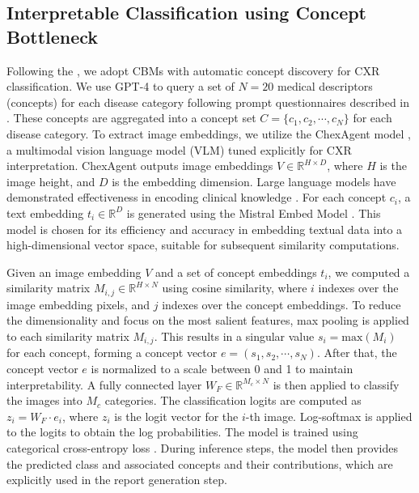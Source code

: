 \documentclass[runningheads]{llncs}
\begin{document}
\subsection{Interpretable Classification using Concept Bottleneck}
\label{subsec:cls}
Following the \cite{oikarinen2023label}, we adopt CBMs with automatic concept discovery for CXR classification. We use GPT-4 \cite{achiam2023gpt} to query a set of $N = 20$ medical descriptors (concepts) for each disease category following prompt questionnaires described in \cite{yan2023robust}. These concepts are aggregated into a concept set $C = \{c_1, c_2, \cdots, c_N \}$ for each disease category. 
% 
To extract image embeddings, we utilize the ChexAgent model \cite{chen2024chexagent}, a multimodal vision language model (VLM) tuned explicitly for CXR interpretation. ChexAgent outputs image embeddings $V \in \mathbb{R}^{H \times D}$, where $H$ is the image height, and $D$ is the embedding dimension. Large language models have demonstrated effectiveness in encoding clinical knowledge \cite{singhal2023large}. For each concept $c_i$, a text embedding $t_i \in \mathbb{R}^D$ is generated using the Mistral Embed Model \cite{jiang2023mistral}. This model is chosen for its efficiency and accuracy in embedding textual data into a high-dimensional vector space, suitable for subsequent similarity computations.

Given an image embedding $V$ and a set of concept embeddings $t_i$, we computed a similarity matrix $M_{i,j} \in \mathbb{R}^{H \times N}$ using cosine similarity,
where $i$ indexes over the image embedding pixels, and $j$ indexes over the concept embeddings. To reduce the dimensionality and focus on the most salient features, max pooling is applied to each similarity matrix $M_{i,j}$. This results in a singular value $s_i = \text{max}(M_i)$ for each concept, forming a concept vector $e= (s_1,s_2,\cdots,s_N)$. After that, the concept vector $e$ is normalized to a scale between 0 and 1 to maintain interpretability. A fully connected layer  $W_F \in \mathbb{R}^{M_c \times N}$ is then applied to classify the images into $M_c$ categories. The classification logits are computed as $z_i = W_F \cdot e_i$, where $z_i$ is the logit vector for the $i$-th image. Log-softmax is applied to the logits to obtain the log probabilities. The model is trained using categorical cross-entropy loss \cite{bishop2006pattern}. During inference steps, the model then provides the predicted class and associated concepts and their contributions, which are explicitly used in the report generation step.
\end{document}
